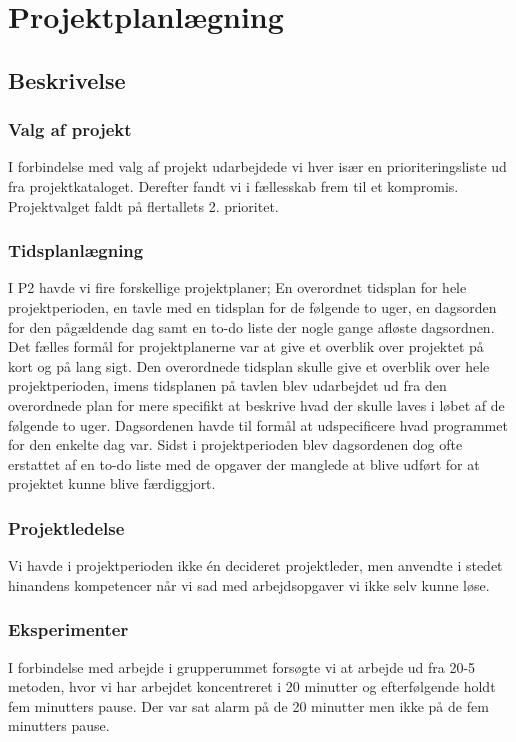 \chapter{Projektplanlægning}

\section{Beskrivelse}

\subsection{Valg af projekt}
I forbindelse med valg af projekt udarbejdede vi hver især en prioriteringsliste ud fra projektkataloget. Derefter fandt vi i fællesskab frem til et kompromis. Projektvalget faldt på flertallets 2. prioritet.

\subsection{Tidsplanlægning}
I P2 havde vi fire forskellige projektplaner; En overordnet tidsplan for hele projektperioden, en tavle med en tidsplan for de følgende to uger, en dagsorden for den pågældende dag samt en to-do liste der nogle gange afløste dagsordnen. 
Det fælles formål for projektplanerne var at give et overblik over projektet på kort og på lang sigt.
Den overordnede tidsplan skulle give et overblik over hele projektperioden, imens tidsplanen på tavlen blev udarbejdet ud fra den overordnede plan for mere specifikt at beskrive hvad der skulle laves i løbet af de følgende to uger. Dagsordenen havde til formål at udspecificere hvad programmet for den enkelte dag var. Sidst i projektperioden blev dagsordenen dog ofte erstattet af en to-do liste med de opgaver der manglede at blive udført for at projektet kunne blive færdiggjort.

\subsection{Projektledelse}
Vi havde i projektperioden ikke én decideret projektleder, men anvendte i stedet hinandens kompetencer når vi sad med arbejdsopgaver vi ikke selv kunne løse.

\subsection{Eksperimenter}
I forbindelse med arbejde i grupperummet forsøgte vi at arbejde ud fra 20-5 metoden, hvor vi har arbejdet koncentreret i 20 minutter og efterfølgende holdt fem minutters pause. Der var sat alarm på de 20 minutter men ikke på de fem minutters pause. 

